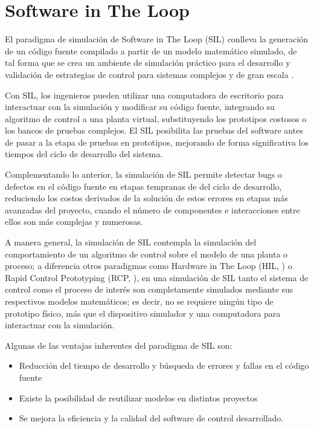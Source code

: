 \section{Software in The Loop}

El paradigma de simulación de Software in The Loop (SIL) conlleva la generación de un código fuente compilado a partir de un modelo matemático simulado, de tal forma que se crea un ambiente de simulación práctico para el desarrollo y validación de estrategias de control para sistemas complejos y de gran escala \cite{SIL_OPAL}. 

Con SIL, los ingenieros pueden utilizar una computadora de escritorio para interactuar con la simulación y modificar su código fuente, integrando su algoritmo de control a una planta virtual, substituyendo los prototipos costosos o los bancos de pruebas complejos. El SIL posibilita las pruebas del software antes de pasar a la etapa de pruebas en prototipos, mejorando de forma significativa los tiempos del ciclo de desarrollo del sistema. 

Complementando lo anterior, la simulación de SIL permite detectar bugs o defectos en el código fuente en etapas tempranas de del ciclo de desarrollo, reduciendo los costos derivados de la solución de estos errores en etapas más avanzadas del proyecto, cuando el número de componentes e interacciones entre ellos son más complejas y numerosas. 

A manera general, la simulación de SIL contempla la simulación del comportamiento de un algoritmo de control sobre el modelo de una planta o proceso; a diferencia otros paradigmas como Hardware in The Loop (HIL, \citet{HIL_OPAL})  o Rapid Control Prototyping (RCP, \citet{RCP_OPAL}), en una simulación de SIL tanto el sistema de control como el proceso de interés son completamente simulados mediante sus respectivos modelos matemáticos; es decir, no se requiere ningún tipo de prototipo físico, más que el dispositivo simulador y una computadora para interactuar con la simulación.


Algunas de las ventajas inherentes del paradigma de SIL son: 

\begin{itemize}
    \item Reducción del tiempo de desarrollo y búsqueda de errores y fallas en el código fuente 
    \item Existe la posibilidad de reutilizar modelos en distintos proyectos 
    \item Se mejora la eficiencia y la calidad del software de control desarrollado. 
\end{itemize}


